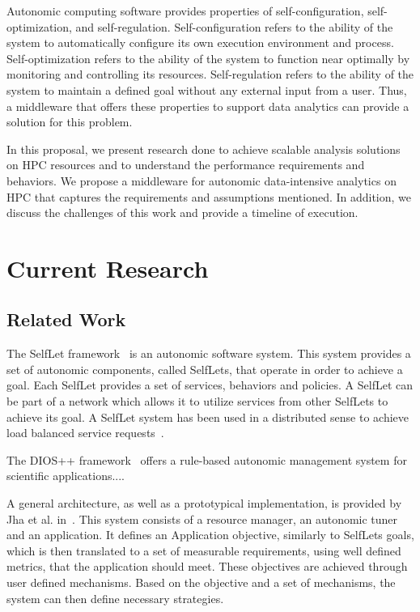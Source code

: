 
Autonomic computing software provides properties of self-configuration, self-optimization, and self-regulation. Self-configuration refers to the ability of the system to automatically configure its own execution environment and process. Self-optimization refers to the ability of the system to function near optimally by monitoring and controlling its resources. Self-regulation refers to the ability of the system to maintain a defined goal without any external input from a user. Thus, a middleware that offers these properties to support data analytics can provide a solution for this problem.

In this proposal, we present research done to achieve scalable analysis solutions on HPC resources and to understand the performance requirements and behaviors. We propose a middleware for autonomic data-intensive analytics on HPC that captures the requirements and assumptions mentioned. In addition, we discuss the challenges of this work and provide a timeline of execution.

\section{Current Research}

\subsection{Related Work}

The SelfLet framework~\cite{bindelli2008building} is an autonomic software system. This system provides a set of autonomic components, called SelfLets, that operate in order to achieve a goal. Each SelfLet provides a set of services, behaviors and policies. A SelfLet can be part of a network which allows it to utilize services from other SelfLets to achieve its goal. A SelfLet system has been used in a distributed sense to achieve load balanced service requests~\cite{calcavecchia2010emergence}.

The DIOS++ framework~\cite{liu2003dios} offers a rule-based autonomic management system for scientific applications....

A general architecture, as well as a prototypical implementation, is provided by Jha et al. in~\cite{jha2009self}. This system consists of a resource manager, an autonomic tuner and an application. It defines an Application objective, similarly to SelfLets goals, which is then translated to a set of measurable requirements, using well defined metrics, that the application should meet. These objectives are achieved through user defined mechanisms. Based on the objective and a set of mechanisms, the system can then define necessary strategies.

